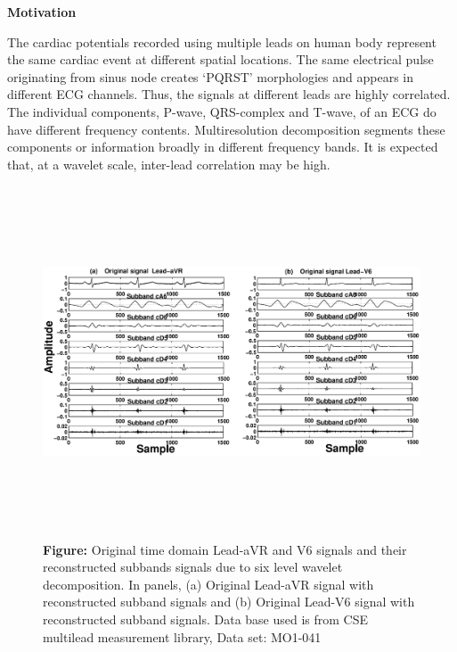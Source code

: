 
\vspace{0.3in}
\noindent \textbf{\Large{Motivation}}
\vspace{0.2in}

\noindent The cardiac potentials recorded using multiple leads on
human body represent the same cardiac event at different spatial
locations. The same electrical pulse originating from sinus node
creates `PQRST' morphologies and appears in different ECG
channels. Thus, the signals at different leads are highly
correlated. The individual components, P-wave, QRS-complex and
T-wave, of an ECG do have different frequency contents.
Multiresolution decomposition segments these components or
information broadly in different frequency bands. It is expected
that, at a wavelet scale, inter-lead correlation may be high.

\begin{figure}[!ht] \center
\includegraphics[height=4.1in,width=6.9in]{TimeM041-aVR-V6.eps}
\caption*{\textbf{Figure:} Original time domain Lead-aVR and V6
signals and their reconstructed subbands signals due to six level
wavelet decomposition. In panels, (a) Original Lead-aVR signal
with reconstructed subband signals and (b) Original Lead-V6 signal
with reconstructed subband signals. Data base used is from CSE
multilead measurement library, Data set:
MO1-041}\label{Corr-subbands-aVR-V6}
\end{figure}

